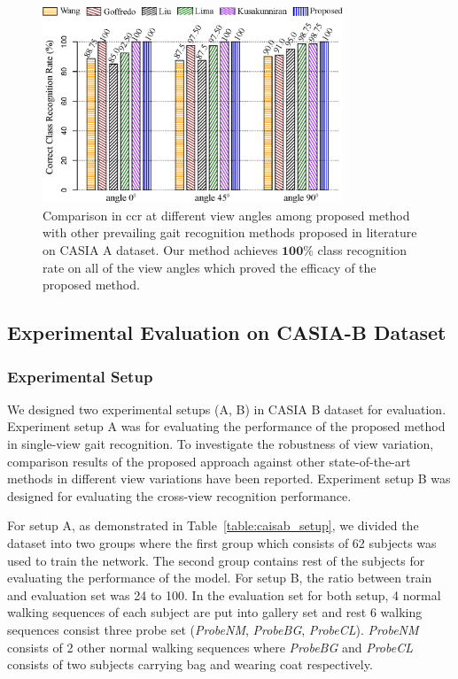 \begin{figure}
	\centering
	\includegraphics[width = 0.8\textwidth]{figures/casia_a_result.eps}
	\caption [Comparison in CCR at different view angles among proposed method with other prevailing gait recognition methods proposed in literature on CASIA A dataset]
	{Comparison in \gls{ccr} at different view angles among proposed method with other prevailing gait recognition methods proposed in literature on CASIA A dataset. Our method achieves $ \textbf{100\% }$ class recognition rate on all of the view angles which proved the efficacy of the proposed method. \label{fig:casia_a_result}
	}
	
\end{figure}



\subsection{Experimental Evaluation on CASIA-B Dataset}
\subsubsection{Experimental Setup}
We designed two experimental setups (A, B) in CASIA B dataset for evaluation. Experiment setup A was for evaluating the performance of the proposed method in single-view gait recognition. To investigate the robustness of view variation, comparison results of the proposed approach against other state-of-the-art methods in different view variations have been reported. Experiment setup B was designed for evaluating the cross-view recognition performance. 

For setup A, as demonstrated in Table~\ref{table:caisab_setup}, we divided the dataset into two groups where the first group which consists of 62 subjects was used to train the network. The second group contains rest of the subjects for evaluating the performance of the model. For setup B, the ratio between train and evaluation set was 24 to 100. In the evaluation set for both setup, 4 normal walking sequences of each subject are put into gallery set and rest 6 walking sequences consist three probe set (\textit{ProbeNM}, \textit{ProbeBG}, \textit{ProbeCL}). \textit{ProbeNM} consists of 2 other normal walking sequences where \textit{ProbeBG} and \textit{ProbeCL} consists of two subjects carrying bag and wearing coat respectively.


